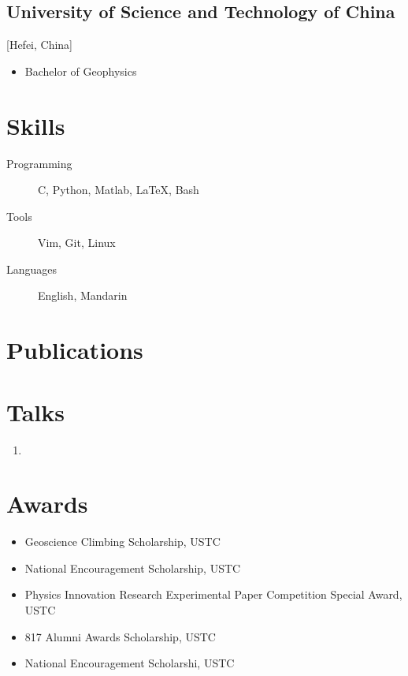 \documentclass{mycv}
\begin{document}
\subsection{University of Science and Technology of China}[Hefei, China]
\vspace{-\parskip}%
\begin{itemize}[label={}]
  \item Bachelor of Geophysics 
\end{itemize}

\section{Skills}

\begin{description}
  \item[Programming] C, Python,  Matlab, \LaTeX, Bash
  \item[Tools] Vim, Git, Linux
  \item[Languages] English, Mandarin
\end{description}

\section{Publications}%


\section{Talks}

\begin{enumerate}
  \item
\end{enumerate}

\section{Awards}

\begin{itemize}
  \item Geoscience Climbing Scholarship, USTC 
  \item National Encouragement Scholarship, USTC 
  \item Physics Innovation Research Experimental Paper Competition Special Award, USTC 
  \item 817 Alumni Awards Scholarship, USTC 
  \item National Encouragement Scholarshi, USTC 
\end{itemize}
\end{document}
